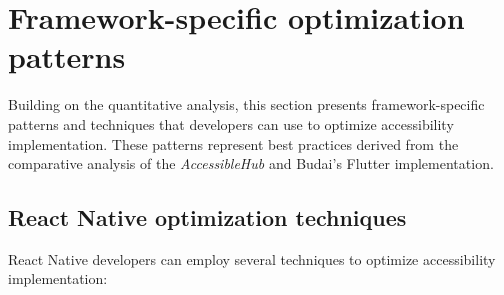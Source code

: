 \section{Framework-specific optimization patterns}
\label{sec:optimization-patterns}

Building on the quantitative analysis, this section presents framework-specific patterns and techniques that developers can use to optimize accessibility implementation. These patterns represent best practices derived from the comparative analysis of the \textit{AccessibleHub} and Budai's Flutter implementation.

\subsection{React Native optimization techniques}
\label{subsec:react-native-optimization}

React Native developers can employ several techniques to optimize accessibility implementation:

